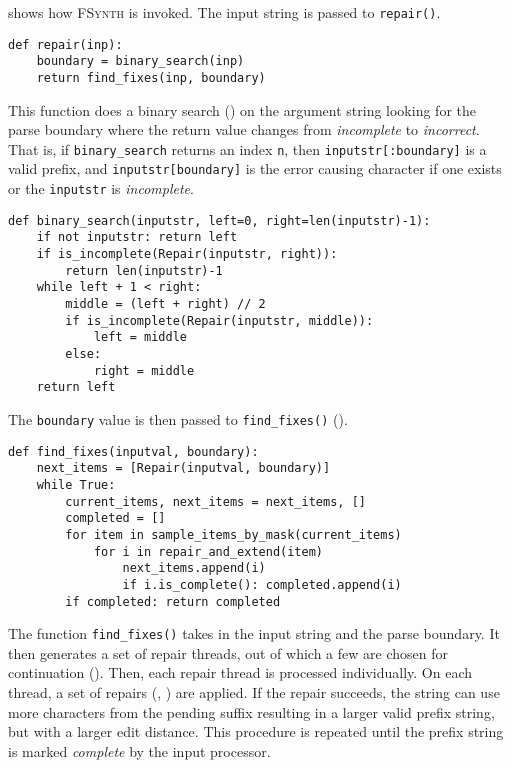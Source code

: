\documentclass[sigconf,review,anonymous]{acmart}
\def\<#1>{\texttt{#1}}
\newcommand{\brepair}{\textsc{FSynth}\xspace}
\begin{document}
 shows how \brepair is invoked. The input string is passed to
\<repair()>.
\begin{lstlisting}[caption=\brepair initial search,label={lst:brepair}]
def repair(inp):
    boundary = binary_search(inp)
    return find_fixes(inp, boundary)
\end{lstlisting}
This function does a binary search () on the
argument string looking for the parse boundary where the return value changes
from \emph{incomplete} to \emph{incorrect}. That is, if \<binary\_search>
returns an index \<n>, then \<inputstr[:boundary]> is a valid prefix, and
\<inputstr[boundary]> is the error causing character if one exists or the
\<inputstr> is \emph{incomplete}.
\begin{lstlisting}[caption=binary search,label={lst:bsearch}]
def binary_search(inputstr, left=0, right=len(inputstr)-1):
    if not inputstr: return left
    if is_incomplete(Repair(inputstr, right)):
        return len(inputstr)-1
    while left + 1 < right:
        middle = (left + right) // 2
        if is_incomplete(Repair(inputstr, middle)):
            left = middle
        else:
            right = middle
    return left
\end{lstlisting}
The \<boundary> value is then passed
to \<find\_fixes()> ().
\begin{lstlisting}[caption=find fixes,label={lst:findfixes}]
def find_fixes(inputval, boundary):
    next_items = [Repair(inputval, boundary)]
    while True:
        current_items, next_items = next_items, []
        completed = []
        for item in sample_items_by_mask(current_items)
            for i in repair_and_extend(item)
                next_items.append(i)
                if i.is_complete(): completed.append(i)
        if completed: return completed
\end{lstlisting}
The function \<find\_fixes()> takes in the input string and the parse boundary.
It then generates a set of repair threads, out of which a few are chosen for
continuation ().
Then, each repair thread is processed individually.
On each thread, a set of repairs (, )
are applied. If the repair succeeds,
the string can use more characters from the pending suffix resulting in a
larger valid prefix string, but with a larger edit distance. This procedure is
repeated until the prefix string is marked \emph{complete} by the input
processor.
\end{document}
